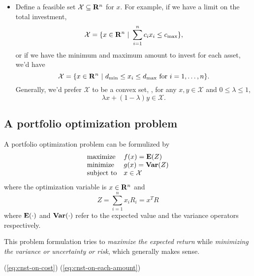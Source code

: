 \begin{itemize}
\item Define a feasible set $\mathcal{X}\subseteq \mathbf{R}^n$ for $x$.
For example, if we have a limit on the total investment,
\begin{equation}
\label{eq:cnst-on-cost}
\mathcal{X} = \{x\in\mathbf{R}^n~|~\sum_{i=1}^n c_i x_i \leq c_\mathrm{max}\},
\end{equation}
or if we have the minimum and maximum amount to invest for each asset,
we'd have
\begin{equation}
\label{eq:cnst-on-each-amount}
\mathcal{X} = \{x\in\mathbf{R}^n~|~d_\mathrm{min} \leq x_i \leq d_\mathrm{max} \mbox{ for } i=1,\ldots,n\}.
\end{equation}
Generally, we'd prefer $\mathcal{X}$ to be a convex set, \ie,
for any $x,y\in\mathcal{X}$ and $0\leq \lambda \leq 1$,
\begin{equation}
\lambda x + (1-\lambda) y \in \mathcal{X}.
\end{equation}

\end{itemize}

\subsection{A portfolio optimization problem}

A portfolio optimization problem can be formulized by
\begin{equation}
\label{eq:opt-port-prob}
\begin{array}{ll}
\mbox{maximize} & f(x) = {\bf E{}}(Z)
\\
\mbox{minimize} & g(x) = \mathop{\bf Var{}}(Z)
\\
\mbox{subject to} & x \in \mathcal{X}
\end{array}
\end{equation}
where the optimization variable is $x\in\mathbf{R}^n$
and
\begin{equation}
Z = \sum_{i=1}^n x_i R_i = x^T R
\end{equation}
where ${\bf E{}}(\cdot)$ and $\mathop{\bf Var{}}(\cdot)$ refer to the expected value and the variance operators respectively.

This problem formulation tries to \emph{maximize the expected return}
while \emph{minimizing the variance or uncertainty or risk}, which generally makes sense.

(\ref{eq:cnst-on-cost})
(\ref{eq:cnst-on-each-amount})



